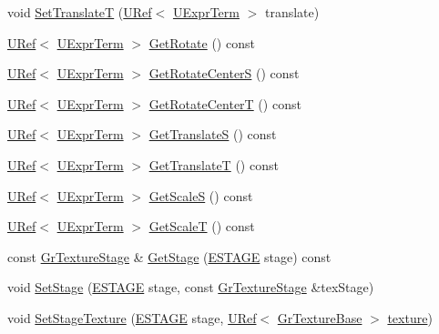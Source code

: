 \begin{CompactItemize}
\item 
void \hyperlink{class_gr_texture_set_6f9329e6556add7e45782245aea5a827}{SetTranslateT} (\hyperlink{class_u_ref}{URef}$<$ \hyperlink{class_u_expr_term}{UExprTerm} $>$ translate)
\item 
\hyperlink{class_u_ref}{URef}$<$ \hyperlink{class_u_expr_term}{UExprTerm} $>$ \hyperlink{class_gr_texture_set_b7f31669a0e6b71ac1ddd1dbf252d331}{GetRotate} () const 
\item 
\hyperlink{class_u_ref}{URef}$<$ \hyperlink{class_u_expr_term}{UExprTerm} $>$ \hyperlink{class_gr_texture_set_3c2f965fdfa704b679922db0825ce6e1}{GetRotateCenterS} () const 
\item 
\hyperlink{class_u_ref}{URef}$<$ \hyperlink{class_u_expr_term}{UExprTerm} $>$ \hyperlink{class_gr_texture_set_69920f47faf856fd77c7637b0167b562}{GetRotateCenterT} () const 
\item 
\hyperlink{class_u_ref}{URef}$<$ \hyperlink{class_u_expr_term}{UExprTerm} $>$ \hyperlink{class_gr_texture_set_5bdc2fd3d5b35939ddfef2aa89543970}{GetTranslateS} () const 
\item 
\hyperlink{class_u_ref}{URef}$<$ \hyperlink{class_u_expr_term}{UExprTerm} $>$ \hyperlink{class_gr_texture_set_3d3c8845a947d560fe4244c3ab9908bb}{GetTranslateT} () const 
\item 
\hyperlink{class_u_ref}{URef}$<$ \hyperlink{class_u_expr_term}{UExprTerm} $>$ \hyperlink{class_gr_texture_set_10cace9330185ac22ac11a7461843812}{GetScaleS} () const 
\item 
\hyperlink{class_u_ref}{URef}$<$ \hyperlink{class_u_expr_term}{UExprTerm} $>$ \hyperlink{class_gr_texture_set_85e460bfad938d3898595f443ea81413}{GetScaleT} () const 
\item 
const \hyperlink{class_gr_texture_stage}{GrTextureStage} \& \hyperlink{class_gr_texture_set_1b95d21a2eb9116e01ca3d41ddf31ff7}{GetStage} (\hyperlink{_gr_config_8h_6df36e6af6bdeed00ff250f968160688}{ESTAGE} stage) const 
\item 
void \hyperlink{class_gr_texture_set_08cc84ed0a2ec34df478d22f1176525f}{SetStage} (\hyperlink{_gr_config_8h_6df36e6af6bdeed00ff250f968160688}{ESTAGE} stage, const \hyperlink{class_gr_texture_stage}{GrTextureStage} \&texStage)
\item 
void \hyperlink{class_gr_texture_set_778c6a7b1b24b8eed0a01ac77ae53fcc}{SetStageTexture} (\hyperlink{_gr_config_8h_6df36e6af6bdeed00ff250f968160688}{ESTAGE} stage, \hyperlink{class_u_ref}{URef}$<$ \hyperlink{class_gr_texture_base}{GrTextureBase} $>$ \hyperlink{glext__bak_8h_8f486379aef534669f4f06f515e7ce6c}{texture})

\end{CompactItemize}
